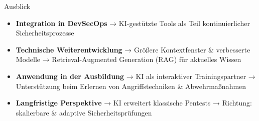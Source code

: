 \documentclass[
	aspectratio=169,	%
	onlytextwidth,		%
	t,					%
	]{beamer}
\begin{document}
\begin{frame}{Ausblick}
	\begin{itemize}
		\item \textbf{Integration in DevSecOps}  
		→ KI-gestützte Tools als Teil kontinuierlicher Sicherheitsprozesse
		
		\item \textbf{Technische Weiterentwicklung}  
		→ Größere Kontextfenster \& verbesserte Modelle  
		→ Retrieval-Augmented Generation (RAG) für aktuelles Wissen
		
		\item \textbf{Anwendung in der Ausbildung}  
		→ KI als interaktiver Trainingspartner  
		→ Unterstützung beim Erlernen von Angriffstechniken \& Abwehrmaßnahmen
		
		\item \textbf{Langfristige Perspektive}  
		→ KI erweitert klassische Pentests  
		→ Richtung: skalierbare \& adaptive Sicherheitsprüfungen
	\end{itemize}
\end{frame}
\end{document}

